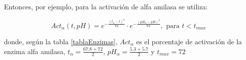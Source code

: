         \par Entonces, por ejemplo, para la activación de alfa amilasa se utiliza:
        
        \begin{equation}
            Act_\alpha(t, pH) = e^{- \frac{(t_\alpha - t)^2}{64}} \cdot e^{- \frac{(pH_\alpha - pH)^2}{64}}, \text{ para } t< t_{max} 
        \end{equation}
        \par donde, según la tabla \ref{tablaEnzimas}, $Act_\alpha$ es el porcentaje de activación de la enzima alfa amilasa, $t_\alpha = \frac{67.8 + 72}{2}$, $pH_\alpha = \frac{5.3 + 5.7}{2}$ y $t_{max} = 72$